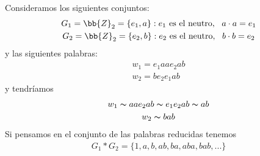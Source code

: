 \begin{ejemplo}
    Consideramos los siguientes conjuntos:
    \begin{gather*}
        G_1 = \bb{Z}_2 = \{e_1, a\}: e_1 \text{ es el neutro},\ \ a\cdot a = e_1\\
        G_2 = \bb{Z}_2 = \{e_2, b\}: e_2 \text{ es el neutro},\ \ b\cdot b = e_2
    \end{gather*}
    y las siguientes palabras:
    \begin{gather*}
        w_1 = e_1aae_2ab\\
        w_2=be_2e_1ab
    \end{gather*}
    y tendríamos 
    \begin{gather*}
        w_1 \thicksim aae_2ab \thicksim e_1e_2ab \thicksim ab\\
        w_2 \thicksim bab
    \end{gather*}
    Si pensamos en el conjunto de las palabras reducidas tenemos 
    \begin{gather*}
        G_1 \ast G_2 = \{1, a, b, ab, ba, aba, bab, ...\}
    \end{gather*}
\end{ejemplo}
